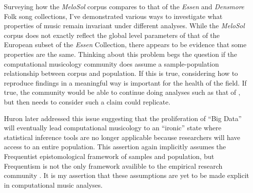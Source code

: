 \documentclass[12pt,]{book}
\begin{document}
Surveying how the \emph{MeloSol} corpus compares to that of the \emph{Essen} and \emph{Densmore} Folk song collections, I've demonstrated various ways to investigate what properties of music remain invariant under different analyses.
While the \emph{MeloSol} corpus does not exactly reflect the global level parameters of that of the European subset of the \emph{Essen} Collection, there appears to be evidence that some properties are the same.
Thinking about this problem begs the question if the computational musicology community does assume a sample-population relationship between corpus and population.
If this is true, considering how to reproduce findings in a meaningful way is important for the health of the field.
If true, the community would be able to continue doing analyses such as that of \citet{huronMelodicArchWestern1996}, but then needs to consider such a claim could replicate.

Huron later addressed this issue \citep{huronVirtuousVexatiousAge2013} suggesting that the proliferation of ``Big Data'' will eventually lead computational musicology to an ``ironic'' state where statistical inference tools are no longer applicable because researchers will have access to an entire population.
This assertion again implicitly assumes the Frequentist epistomological framework of samples and population, but Frequentism is not the only framework availible to the empirical research community \citep{dienesUnderstandingPsychologyScience2008}.
It is my assertion that these assumptions are yet to be made explicit in computational music analyses.
\end{document}
